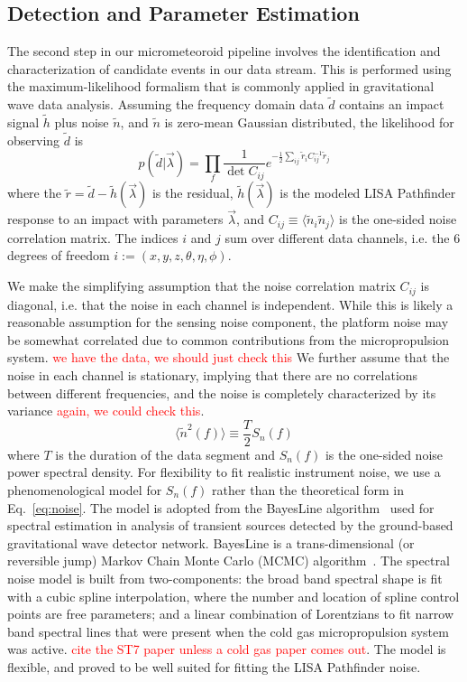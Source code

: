 \documentclass[twocolumn, trackchanges]{aastex61}
\newcommand{\red}[1]{\textcolor{red}{#1}}
\newcommand{\data}{\tilde d}
\newcommand{\model}{\tilde h}
\newcommand{\residual}{\tilde r}
\newcommand{\params}{{\vec \lambda}}
\newcommand{\n}{\tilde n}
\newcommand{\Cij}{C_{ij}}
\newcommand{\invCij}{C_{ij}^{-1}}
\begin{document}
\subsection{Detection and Parameter Estimation}\label{sec:MCMC}
The second step in our micrometeoroid pipeline involves the identification and characterization of candidate events in our data stream.  This is performed using the maximum-likelihood formalism that is commonly applied in gravitational wave data analysis. 
Assuming the frequency domain data $\data$ contains an impact signal $\model$ plus noise $\n$, and $\n$ is zero-mean Gaussian distributed, the likelihood for observing  $\data$ is
\begin{equation}
p(\data|\params) = \prod_f \frac{1}{\det \Cij} e^{-\frac{1}{2}\sum_{ij} \residual_i \invCij \residual_j }
\label{eq:likelihood}
\end{equation}
where the $\residual = \data - \model(\params)$ is the residual, $\model(\params)$ is the modeled LISA Pathfinder response to an impact with parameters $\params$, and  $\Cij \equiv \langle \n_i \n_j\rangle$ is the one-sided noise correlation matrix. The indices $i$ and $j$ sum over different data channels, i.e. the 6 degrees of freedom $i:=(x,y,z,\theta,\eta,\phi)$.

We make the simplifying assumption that the noise correlation matrix $\Cij$ is diagonal, i.e. that the noise in each channel is independent. While this is likely a reasonable assumption for the sensing noise component, the platform noise may be somewhat correlated due to common contributions from the micropropulsion system. \red{we have the data, we should just check this}
We further assume that the noise in each channel is stationary, implying that there are no  correlations between different frequencies, and the noise is completely characterized by its variance  \red{again, we could check this}.
\begin{equation}
\langle \n^2(f)\rangle \equiv \frac{T}{2}S_n(f)
\end{equation}
where $T$ is the duration of the data segment and $S_n(f)$ is the one-sided noise power spectral density.
For flexibility to fit realistic instrument noise, we use a phenomenological model for $S_n(f)$ rather than the theoretical form in Eq.~\ref{eq:noise}.
The model is adopted from the BayesLine algorithm~\citep{Littenberg_15} used for spectral estimation in analysis of transient sources detected by the ground-based gravitational wave detector network.
BayesLine is a trans-dimensional (or reversible jump) Markov Chain Monte Carlo (MCMC) algorithm~\citep{Green_95}.
The spectral noise model is built from two-components:  the broad band spectral shape is fit with a cubic spline interpolation, where the number and location of spline control points are free parameters; and a linear combination of  Lorentzians to fit narrow band spectral lines that were present when the cold gas micropropulsion system was active. \red{cite the ST7 paper unless a cold gas paper comes out}.
The model is flexible, and proved to be well suited for fitting the LISA Pathfinder noise.
\end{document}
